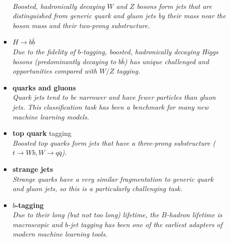\documentclass[12pt,letterpaper]{article}
\begin{document}
\begin{itemize}
\begin{itemize}
\begin{itemize}
			\\\textit{Boosted, hadronically decaying $W$ and $Z$ bosons form jets that are distinguished from generic quark and gluon jets by their mass near the boson mass and their two-prong substructure.}
			\item \textbf{$H\rightarrow b\bar{b}$}~\cite{Datta:2019ndh,Lin:2018cin,Moreno:2019neq,Chakraborty:2019imr,Sirunyan:2020lcu,Chung:2020ysf,Tannenwald:2020mhq,guo2020boosted,Abbas:2020khd,Jang:2021eph,Khosa:2021cyk}
			\\\textit{Due to the fidelity of $b$-tagging, boosted, hadronically decaying Higgs bosons (predominantly decaying to $b\bar{b}$) has unique challenged and opportunities compared with $W/Z$ tagging.}
			\item \textbf{quarks and gluons}~\cite{ATL-PHYS-PUB-2017-017,Komiske:2016rsd,Cheng:2017rdo,Stoye:DLPS2017,Chien:2018dfn,Moreno:2019bmu,Kasieczka:2018lwf,1806025,Lee:2019ssx,Lee:2019cad,Dreyer:2020brq,Romero:2021qlf,Filipek:2021qbe,Dreyer:2021hhr,Bright-Thonney:2022xkx,CrispimRomao:2023ssj,Athanasakos:2023fhq,He:2023cfc,Shen:2023ofd}
			\\\textit{Quark jets tend to be narrower and have fewer particles than gluon jets.  This classification task has been a benchmark for many new machine learning models.}
			\item \textbf{top quark} tagging~\cite{Almeida:2015jua,Stoye:DLPS2017,Kasieczka:2019dbj,Chakraborty:2020yfc,Diefenbacher:2019ezd,Butter:2017cot,Kasieczka:2017nvn,Macaluso:2018tck,Bhattacharya:2020vzu,Lim:2020igi,Dreyer:2020brq,Aguilar-Saavedra:2021rjk,Andrews:2021ejw,Dreyer:2022yom,Ahmed:2022hct,Munoz:2022gjq,Bhattacherjee:2022gjq,Choi:2023slq,He:2023cfc,Bogatskiy:2023nnw,Shen:2023ofd}
			\\\textit{Boosted top quarks form jets that have a three-prong substructure ($t\rightarrow Wb,W\rightarrow q\bar{q}$).}
			\item \textbf{strange jets}~\cite{Nakai:2020kuu,Erdmann:2019blf,Erdmann:2020ovh,Subba:2023rpm}
			\\\textit{Strange quarks have a very similar fragmentation to generic quark and gluon jets, so this is a particularly challenging task.}
			\item \textbf{$b$-tagging}~\cite{Sirunyan:2017ezt,Guest:2016iqz,Keck:2018lcd,bielkov2020identifying,Bols:2020bkb,ATL-PHYS-PUB-2017-003,ATL-PHYS-PUB-2020-014,Liao:2022ufk}
			\\\textit{Due to their long (but not too long) lifetime, the $B$-hadron lifetime is macroscopic and $b$-jet tagging has been one of the earliest adapters of modern machine learning tools.}

\end{itemize}
\end{itemize}
\end{itemize}
\end{document}
